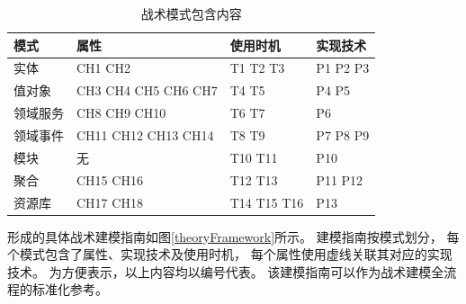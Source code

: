 {\footnotesize
\begin{longtable}[h]{m{70pt}|m{125pt}|m{100pt}|m{75pt}}
    \caption[战术模式包含内容]{战术模式包含内容} \label{modelingframework} \\
        \hline  
        模式&属性&使用时机&实现技术\\
        \hline
        实体&CH1 CH2&T1 T2 T3&P1 P2 P3\\
        \hline
        值对象&CH3 CH4 CH5 CH6 CH7& T4 T5 &P4 P5\\
        \hline
        领域服务&CH8 CH9 CH10& T6 T7 &P6\\
        \hline
        领域事件&CH11 CH12 CH13 CH14&T8 T9&P7 P8 P9\\
        \hline
        模块&无&T10 T11&P10\\
        \hline
        聚合&CH15 CH16& T12 T13&P11 P12\\
        \hline
        资源库&CH17 CH18& T14 T15 T16& P13\\
        \hline

\end{longtable}
}

形成的具体战术建模指南如图\ref{theoryFramework}所示。
建模指南按模式划分，
每个模式包含了属性、实现技术及使用时机，
每个属性使用虚线关联其对应的实现技术。
为方便表示，以上内容均以编号代表。
该建模指南可以作为战术建模全流程的标准化参考。


